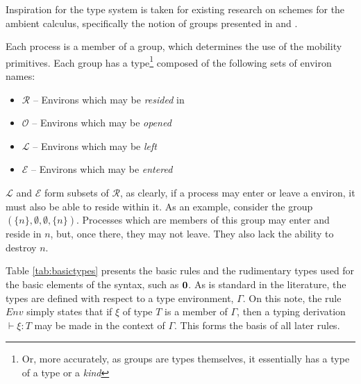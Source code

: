 \documentclass[orivec,envcountsame]{llncs}
\begin{document}
Inspiration for the type system is taken for existing research on
schemes for the ambient calculus, specifically the notion of groups
presented in \cite{ambienttypes} and \cite{m3}.

Each process is a member of a group, which determines the use of the
mobility primitives.  Each group has a type\footnote{Or, more
  accurately, as groups are types themselves, it essentially has a
  type of a type or a \emph{kind}} composed of the following sets of
environ names:

\begin{itemize}
\item $\mathscr{R}$ -- Environs which may be \emph{resided} in
\item $\mathscr{O}$ -- Environs which may be \emph{opened}
\item $\mathscr{L}$ -- Environs which may be \emph{left}
\item $\mathscr{E}$ -- Environs which may be \emph{entered}
\end{itemize}

$\mathscr{L}$ and $\mathscr{E}$ form subsets of $\mathscr{R}$, as
clearly, if a process may enter or leave a environ, it must also be
able to reside within it.  As an example, consider the group
$(\{n\},\emptyset, \emptyset,\{n\})$.  Processes which are members of
this group may enter and reside in $n$, but, once there, they may not
leave.  They also lack the ability to destroy $n$.

Table \ref{tab:basictypes} presents the basic rules and the rudimentary
types used for the basic elements of the syntax, such as $\textbf{0}$.  As is
standard in the literature, the types are defined with respect to a type
environment, $\Gamma$.  On this note, the rule $Env$ simply states that
if $\xi$ of type $T$ is a member of $\Gamma$, then a typing derivation
$\vdash \xi : T$ may be made in the context of $\Gamma$.  This forms the
basis of all later rules.
\end{document}
